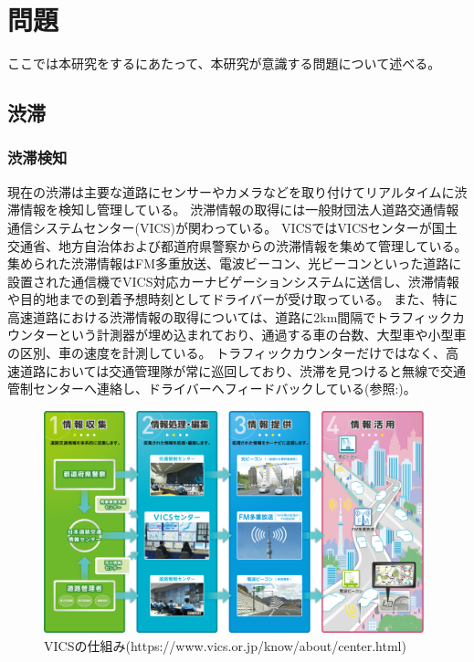 \chapter{問題}
ここでは本研究をするにあたって、本研究が意識する問題について述べる。

\section{渋滞}
\subsection{渋滞検知}
現在の渋滞は主要な道路にセンサーやカメラなどを取り付けてリアルタイムに渋滞情報を検知し管理している。
渋滞情報の取得には一般財団法人道路交通情報通信システムセンター(VICS)が関わっている。
VICSではVICSセンターが国土交通省、地方自治体および都道府県警察からの渋滞情報を集めて管理している。
集められた渋滞情報はFM多重放送、電波ビーコン、光ビーコンといった道路に設置された通信機でVICS対応カーナビゲーションシステムに送信し、渋滞情報や目的地までの到着予想時刻としてドライバーが受け取っている。
また、特に高速道路における渋滞情報の取得については、道路に2km間隔でトラフィックカウンターという計測器が埋め込まれており、通過する車の台数、大型車や小型車の区別、車の速度を計測している。
トラフィックカウンターだけではなく、高速道路においては交通管理隊が常に巡回しており、渋滞を見つけると無線で交通管制センターへ連絡し、ドライバーへフィードバックしている(参照:)。

\begin{figure}[htbp]
  \begin{center}
   \includegraphics[width=11cm]{figs/vics.png}
  \end{center}
  \caption{VICSの仕組み(https://www.vics.or.jp/know/about/center.html)}
  \label{fig:vics_system}
\end{figure}


